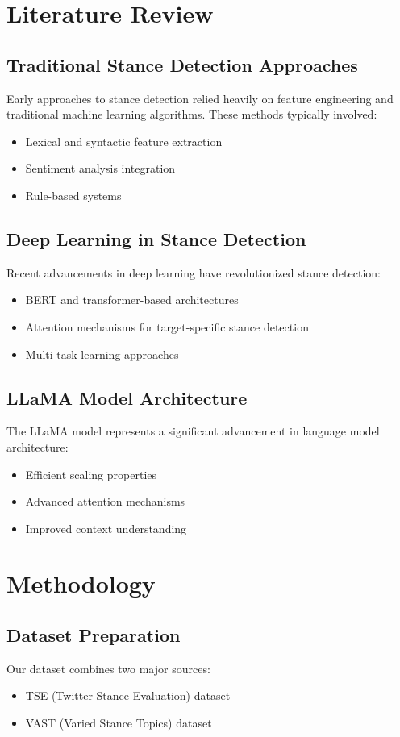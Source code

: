 \documentclass[twocolumn]{article}
\begin{document}
\section{Literature Review}
\subsection{Traditional Stance Detection Approaches}
Early approaches to stance detection relied heavily on feature engineering and traditional machine learning algorithms. These methods typically involved:
\begin{itemize}
    \item Lexical and syntactic feature extraction
    \item Sentiment analysis integration
    \item Rule-based systems
\end{itemize}

\subsection{Deep Learning in Stance Detection}
Recent advancements in deep learning have revolutionized stance detection:
\begin{itemize}
    \item BERT and transformer-based architectures
    \item Attention mechanisms for target-specific stance detection
    \item Multi-task learning approaches
\end{itemize}

\subsection{LLaMA Model Architecture}
The LLaMA model represents a significant advancement in language model architecture:
\begin{itemize}
    \item Efficient scaling properties
    \item Advanced attention mechanisms
    \item Improved context understanding
\end{itemize}

\section{Methodology}
\subsection{Dataset Preparation}
Our dataset combines two major sources:
\begin{itemize}
    \item TSE (Twitter Stance Evaluation) dataset
    \item VAST (Varied Stance Topics) dataset
\end{itemize}
\end{document}
